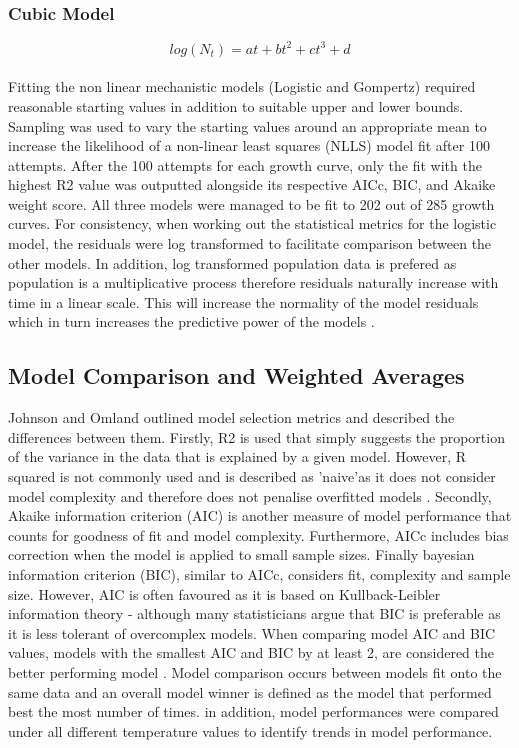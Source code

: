 \documentclass[11pt]{article}
\begin{document}
    \subsubsection{Cubic Model}
    \begin{equation}
        log(N_t) = at + bt^2 + ct^3 + d
    \end{equation}\\

Fitting the non linear mechanistic models (Logistic and Gompertz) required reasonable starting values in addition to suitable upper and lower bounds. Sampling was used to vary the starting values around an appropriate mean to increase the likelihood of a non-linear least squares (NLLS) model fit after 100 attempts. After the 100 attempts for each growth curve, only the fit with the highest R2 value was outputted alongside its respective AICc, BIC, and Akaike weight score. All three models were managed to be fit to 202 out of 285 growth curves. For consistency, when working out the statistical metrics for the logistic model, the residuals were log transformed to facilitate comparison between the other models. In addition, log transformed population data is prefered as population is a multiplicative process therefore residuals naturally increase with time in a linear scale. This will increase the normality of the model residuals which in turn increases the predictive power of the models \cite{Freckleton2002}.


    \subsection{Model Comparison and Weighted Averages}
Johnson and Omland outlined model selection metrics and described the differences between them. Firstly, R2 is used that simply suggests the proportion of the variance in the data that is explained by a given model. However, R squared is not commonly used and is described as 'naive'as it does not consider model complexity and therefore does not penalise overfitted models \cite{JOHNSON2004101}. Secondly, Akaike information criterion (AIC) is another measure of model performance that counts for goodness of fit and model complexity. Furthermore, AICc includes bias correction when the model is applied to small sample sizes. Finally bayesian information criterion (BIC), similar to AICc, considers fit, complexity and sample size. However, AIC is often favoured as it is based on Kullback-Leibler information theory \cite{JOHNSON2004101} - although many statisticians argue that BIC is preferable as it is less tolerant of overcomplex models. When comparing model AIC and BIC values, models with the smallest AIC and BIC by at least 2, are considered the better performing model \cite{JOHNSON2004101}. Model comparison occurs between models fit onto the same data and an overall model winner is defined as the model that performed best the most number of times. in addition, model performances were compared under all different temperature values to identify trends in model performance.\\
\end{document}
